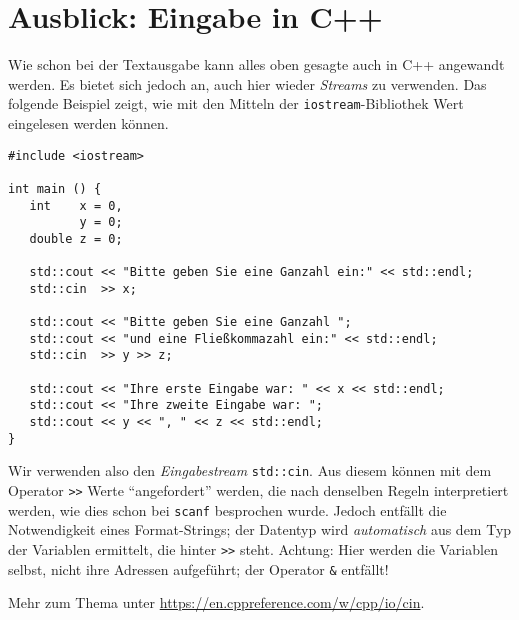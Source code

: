 \section{Ausblick: Eingabe in C++}
\begin{plusbox}
Wie schon bei der Textausgabe kann alles oben gesagte auch in C++ angewandt werden. Es bietet sich jedoch an, auch hier wieder \emph{Streams} zu verwenden. Das folgende Beispiel zeigt, wie mit den Mitteln der \texttt{iostream}-Bibliothek Wert eingelesen werden können.

\begin{codebox}
\begin{verbatim}
#include <iostream>

int main () {
   int    x = 0,
          y = 0;
   double z = 0;
   
   std::cout << "Bitte geben Sie eine Ganzahl ein:" << std::endl;
   std::cin  >> x;
   
   std::cout << "Bitte geben Sie eine Ganzahl ";
   std::cout << "und eine Fließkommazahl ein:" << std::endl;
   std::cin  >> y >> z;
   
   std::cout << "Ihre erste Eingabe war: " << x << std::endl;
   std::cout << "Ihre zweite Eingabe war: ";
   std::cout << y << ", " << z << std::endl;
}
\end{verbatim}
\end{codebox}

Wir verwenden also den \emph{Eingabestream} \texttt{std::cin}. Aus diesem können mit dem Operator \texttt{>{}>} Werte \enquote{angefordert} werden, die nach denselben Regeln interpretiert werden, wie dies schon bei \texttt{scanf} besprochen wurde. Jedoch entfällt die Notwendigkeit eines Format-Strings; der Datentyp wird \emph{automatisch} aus dem Typ der Variablen ermittelt, die hinter \texttt{>{}>} steht. Achtung: Hier werden die Variablen selbst, nicht ihre Adressen aufgeführt; der Operator \texttt{\&} entfällt!

Mehr zum Thema unter \url{https://en.cppreference.com/w/cpp/io/cin}.
\end{plusbox}